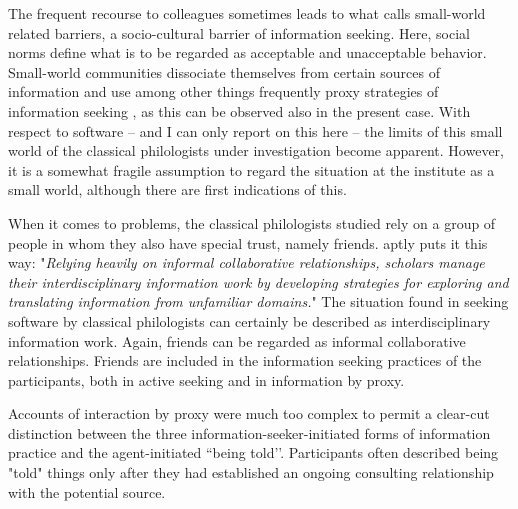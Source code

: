\documentclass[12pt, a4paper, titlepage, oneside, abstract=true, toc=listof, toc=bibliography, BCOR=1cm]{scrreprt}
\begin{document}
{%
The frequent recourse to colleagues sometimes leads to what \citet[p. 57]{Savolainen2015} calls small-world related barriers, a socio-cultural barrier of information seeking. Here, social norms define what is to be regarded as acceptable and unacceptable behavior. Small-world communities dissociate themselves from certain sources of information and use among other things frequently proxy strategies of information seeking \citep[p. 57]{Savolainen2015}, as this can be observed also in the present case. With respect to software \--- and I can only report on this here \--- the limits of this small world of the classical philologists under investigation become apparent. However, it is a somewhat fragile assumption to regard the situation at the institute as a small world, although there are first indications of this.

When it comes to problems, the classical philologists studied rely on a group of people in whom they also have special trust, namely friends. \citet[p. 85]{Palmer2002} aptly puts it this way: "\textit{Relying heavily on informal collaborative relationships, scholars manage their interdisciplinary information work by developing strategies for exploring and translating information from unfamiliar domains.}" The situation found in seeking software by classical philologists can certainly be described as interdisciplinary information work. Again, friends can be regarded as informal collaborative relationships. Friends are included in the information seeking practices of the participants, both in active seeking and in information by proxy.

 

\citep[p. 35]{McKenzie2003} Accounts of interaction by proxy were much too complex to permit a clear-cut distinction between the three information-seeker-initiated forms of information practice and the agent-initiated ``being told’’. Participants often described being "told" things only after they had established an ongoing consulting relationship with the potential source.



\citep[p. 173]{Palmer2009}


}
\end{document}
